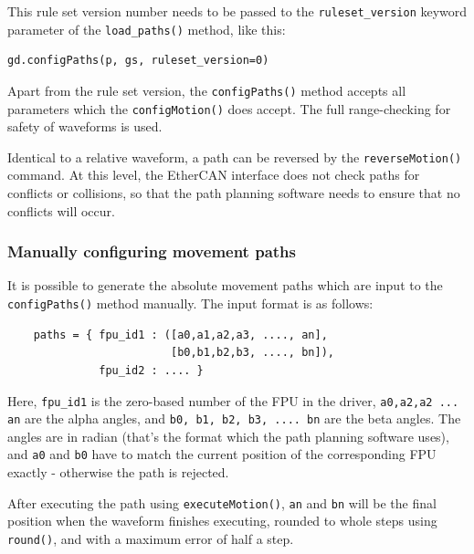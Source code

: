 \documentclass[11pt,a4paper]{report}
\begin{document}
%
%
This rule set version number needs to be passed to the
\texttt{ruleset\_version} keyword parameter of the
\texttt{load\_paths()} method, like this:


\begin{verbatim}
gd.configPaths(p, gs, ruleset_version=0)
\end{verbatim}

Apart from the rule set version, the \texttt{configPaths()} method
accepts all parameters which the \texttt{configMotion()} does accept.
The full range-checking for safety of waveforms is used.

Identical to a relative waveform, a path can be reversed by the
\texttt{reverseMotion()} command. At this level, the EtherCAN interface does not
check paths for conflicts or collisions, so that the path planning
software needs to ensure that no conflicts will occur.

\subsubsection{Manually configuring movement paths}
\label{sec:manuallyconfiguringpaths}%
%
%
%
%
It is possible to generate the absolute movement paths which are input
to the \texttt{configPaths()} method manually.  The input format is as
follows:

\begin{verbatim}
    paths = { fpu_id1 : ([a0,a1,a2,a3, ...., an],
                         [b0,b1,b2,b3, ...., bn]),
              fpu_id2 : .... }
\end{verbatim}

Here, \verb+fpu_id1+ is the zero-based number of the FPU in the
driver, \verb+a0,a2,a2 ... an+ are the alpha angles, and
\verb+b0, b1, b2, b3, .... bn+ are the beta angles. The angles are in
radian (that's the format which the path planning software uses), and
\verb+a0+ and \verb+b0+ have to match the current position of the
corresponding FPU exactly - otherwise the path is rejected.

After executing the path using \texttt{executeMotion()}, \verb+an+ and
\verb+bn+ will be the final position when the waveform finishes
executing, rounded to whole steps using \texttt{round()}, and with a
maximum error of half a step.
\end{document}
